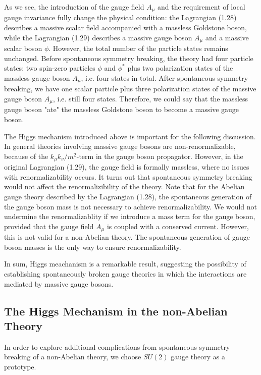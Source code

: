 As we see, the introduction of the gauge field $A_\mu$ and the requirement of local gauge invariance fully change the physical condition: the Lagrangian (1.28) describes a massive scalar field accompanied with a massless Goldstone boson, while the Lagrangian (1.29) describes a massive gauge boson $A_\mu$ and a massive scalar boson $\phi$. However, the total number of the particle states remains unchanged. Before spontaneous symmetry breaking, the theory had four particle states: two spin-zero particles $\phi$ and $\phi^{\ast}$ plus two polarization states of the massless gauge boson $A_\mu$, i.e. four states in total. After spontaneous symmetry breaking, we have one scalar particle plus three polarization states of the massive gauge boson $A_\mu$, i.e. still four states. Therefore, we could say that the massless gauge boson "ate" the massless Goldstone boson to become a massive gauge boson. 


The Higgs mechanism introduced above is important for the following discussion. In general theories involving massive gauge bosons are non-renormalizable, because of the $k_\mu k_\nu/m^2$-term in the gauge boson propagator. However, in the original Lagrangian (1.29), the gauge field is formally massless, where no issues with renormalizability occurs. It turns out that spontaneous symmetry breaking would not affect the renormalizibility of the theory\cite{thooft1,thooft2,tHooftVeltman}. Note that for the Abelian gauge theory described by the Lagrangian (1.28), the spontaneous generation of the gauge boson mass is not necessary to achieve renormalizability. We would not undermine the renormalizablity if we introduce a mass term for the gauge boson, provided that the gauge field $A_\mu$ is coupled with a conserved current. However, this is not valid for a non-Abelian theory. The spontaneous generation of gauge boson masses is the only way to ensure renormalizability.

In sum, Higgs meachanism is a remarkable result, suggesting the possibility of establishing spontaneously broken gauge theories in which the interactions are mediated by massive gauge bosons. 
 

\subsection{The Higgs Mechanism in the non-Abelian Theory}
In order to explore additional complications from spontaneous symmetry breaking of a non-Abelian theory, we choose $SU(2)$ gauge theory as a prototype.

